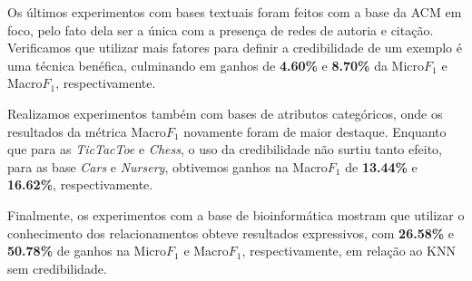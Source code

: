 Os últimos experimentos com bases textuais foram feitos com a base da \textsc{ACM} em foco, pelo fato dela ser a única com a presença de redes de autoria e citação. Verificamos que utilizar mais fatores para definir a credibilidade de um exemplo é uma técnica benéfica, culminando em ganhos de \textbf{4.60\%} e \textbf{8.70\%} da Micro$F_1$ e Macro$F_1$, respectivamente.

Realizamos experimentos também com bases de atributos categóricos, onde os resultados da métrica Macro$F_1$ novamente foram de maior destaque. Enquanto que para as \textit{TicTacToe} e \textit{Chess}, o uso da credibilidade não surtiu tanto efeito, para as base \textit{Cars} e \textit{Nursery}, obtivemos ganhos na Macro$F_1$ de \textbf{13.44\%} e \textbf{16.62\%}, respectivamente.

Finalmente, os experimentos com a base de bioinformática mostram que utilizar o conhecimento dos relacionamentos obteve resultados expressivos, com \textbf{26.58\%} e \textbf{50.78\%} de ganhos na Micro$F_1$ e Macro$F_1$,
respectivamente, 
em relação ao \textsc{KNN} sem credibilidade.


